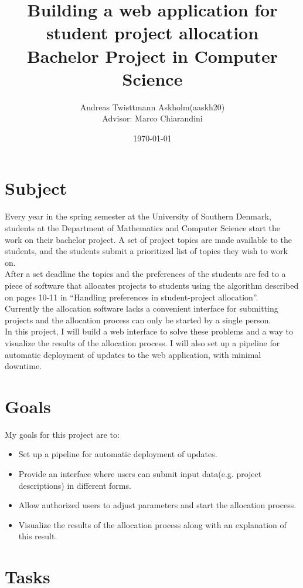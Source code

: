 \documentclass{article}
\title{
	Building a web application for student project allocation\\
	\large Bachelor Project in Computer Science}
\author{Andreas Twisttmann Askholm(aaskh20)\\{\small Advisor: Marco Chiarandini}}
\date{\today}
\begin{document}
\maketitle

\section{Subject}

Every year in the spring semester at the University of Southern Denmark, students at the Department of Mathematics and Computer Science start the work on their bachelor project. A set of project topics are made available to the students, and the students submit a prioritized list of topics they wish to work on.\\
After a set deadline the topics and the preferences of the students are fed to a piece of software that allocates projects to students using the algorithm described on pages 10-11 in ``Handling preferences in student-project allocation''\cite{Chiarandini2019}.\\
Currently the allocation software lacks a convenient interface for submitting projects and the allocation process can only be started by a single person.\\
In this project, I will build a web interface to solve these problems and a way to visualize the results of the allocation process. I will also set up a pipeline for automatic deployment of updates to the web application, with minimal downtime.

\section{Goals}

My goals for this project are to:
\begin{itemize}
	\item Set up a pipeline for automatic deployment of updates.
	\item Provide an interface where users can submit input data(e.g. project descriptions) in different forms.
	\item Allow authorized users to adjust parameters and start the allocation process.
	\item Visualize the results of the allocation process along with an explanation of this result.
\end{itemize}

\section{Tasks}
\end{document}

